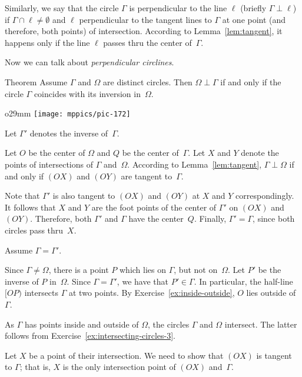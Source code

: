Similarly, we say that the circle $\Gamma$ is perpendicular to the line $\ell$ (briefly $\Gamma\perp \ell$)
if $\Gamma\cap\ell\ne \emptyset$ and $\ell$ perpendicular to the tangent lines to $\Gamma$ at one point (and therefore, both points) of intersection.
According to Lemma~\ref{lem:tangent}, 
it happens only if the line $\ell$ passes thru the center of~$\Gamma$.

Now we can talk about \emph{perpendicular circlines}.

\begin{thm}{Theorem}\label{thm:perp-inverse}
Assume $\Gamma$ and $\Omega$ are distinct circles. 
Then $\Omega\perp\Gamma$ if and only if the circle $\Gamma$ coincides with its inversion in~$\Omega$.
\end{thm}

\begin{wrapfigure}[7]{o}{29mm}
\vskip-4mm
\centering
\texttt{[image: mppics/pic-172]}
\end{wrapfigure}

Let $\Gamma'$ denotes the inverse of~$\Gamma$.

Let $O$ be the center of $\Omega$
and $Q$ be the center of~$\Gamma$.
Let $X$ and $Y$ denote the points of intersections of  $\Gamma$ and~$\Omega$.
According to Lemma~\ref{lem:tangent}, $\Gamma\perp\Omega$ if and only if $(OX)$ and $(OY)$ are tangent to~$\Gamma$.

Note that $\Gamma'$ is also tangent to $(OX)$ and $(OY)$ at $X$ and $Y$ correspondingly. 
It follows that $X$ and $Y$ are the foot points of the center of $\Gamma'$ on $(OX)$ and $(OY)$.
Therefore, both $\Gamma'$ and $\Gamma$ have the center~$Q$.
Finally, $\Gamma'=\Gamma$, since both circles pass thru~$X$.

Assume $\Gamma=\Gamma'$.

Since $\Gamma\ne \Omega$, there is a point $P$ which lies on $\Gamma$, but not on~$\Omega$.
Let $P'$ be the inverse of $P$ in~$\Omega$.
Since $\Gamma=\Gamma'$, we have that $P'\in \Gamma$.
In particular, the half-line $[OP)$ intersects $\Gamma$ at two points.
By Exercise~\ref{ex:inside-outside}, 
 $O$ lies outside of~$\Gamma$.

As $\Gamma$ has points inside and outside of $\Omega$,
the circles $\Gamma$ and $\Omega$ intersect.
The latter follows from Exercise~\ref{ex:intersecting-circles-3}.

Let $X$ be a point of their intersection.
We need to show that $(OX)$ is tangent to $\Gamma$;
that is, $X$ is the only intersection point of $(OX)$ and~$\Gamma$.


